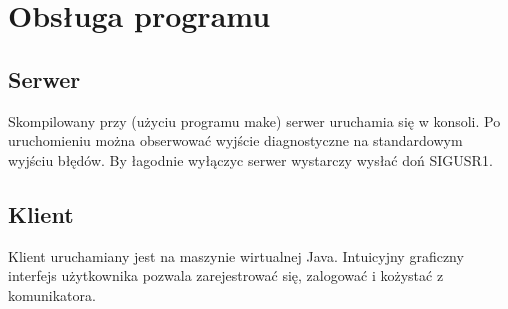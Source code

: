 \documentclass[10pt,a4paper]{article}
\begin{document}
\section{Obsługa programu}
	\subsection{Serwer}
		Skompilowany przy (użyciu programu make) serwer uruchamia się w konsoli.
		Po uruchomieniu można obserwować wyjście diagnostyczne na standardowym wyjściu błędów.
		By łagodnie wyłączyc serwer wystarczy wysłać doń SIGUSR1.
	\subsection{Klient}
		Klient uruchamiany jest na maszynie wirtualnej Java.
		Intuicyjny graficzny interfejs użytkownika pozwala zarejestrować się, zalogować i kożystać z komunikatora.
\end{document}
